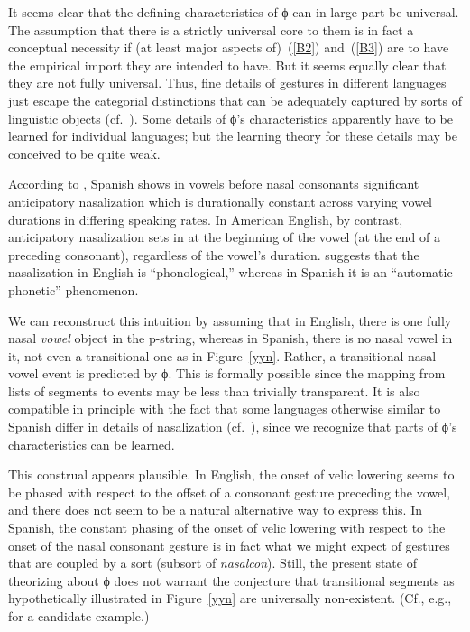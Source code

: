 \documentclass[output=paper]{langsci/langscibook}
\begin{document}
It seems clear that the defining characteristics of ϕ can in
large part be universal. The assumption that there is a strictly
universal core to them is in fact a conceptual necessity if (at least major
aspects of)~(\ref{B2}) and~(\ref{B3}) are to have the empirical import they
are intended to have.  But it seems equally clear that they are not fully
universal. Thus, fine details of gestures in different languages just
escape the categorial distinctions that can be adequately captured by sorts
of linguistic objects (cf.\ \citealt{lade:80}). Some
details of ϕ's characteristics apparently have to be learned for
individual languages; but the learning theory for these details may be
conceived to be quite weak.  %

According to \cite{sole:95}, Spanish shows
in vowels before nasal consonants significant anticipatory nasalization
which is durationally constant across varying vowel durations in differing
speaking rates. In American English, by contrast, anticipatory nasalization
sets in at the beginning of the vowel (at the end of a preceding
consonant), regardless of the vowel's duration.
\cite{sole:95} suggests that the
nasalization in English is ``phonological,'' whereas in Spanish it is an
``automatic phonetic'' phenomenon.

We can reconstruct this intuition by assuming that in English, there is one
fully nasal \textit{vowel}\/ object in the p-string, whereas in Spanish, there
is no nasal vowel in it, not even a transitional one as
in Figure~\ref{yyn}.  Rather, a transitional nasal vowel event is predicted
by ϕ. This is formally possible since the mapping from lists of
segments to events may be less than trivially transparent. It is also
compatible in principle with the fact that some languages otherwise similar
to Spanish differ in details of nasalization
(cf.\ \citealt{clum:76}), since we recognize that parts of
ϕ's characteristics can be learned.

This construal appears plausible. In English, the onset of velic lowering
seems to be phased 
with respect to
the offset of a consonant gesture preceding the
vowel, and there does not seem to be a natural alternative way to express
this. In Spanish, the constant phasing of the onset of velic lowering 
with respect to
the onset of the nasal consonant gesture is in fact what we might expect of
gestures that are coupled by a sort (subsort of \textit{nasalcon}\/). Still,
the present state of theorizing about ϕ does not warrant the
conjecture that transitional segments as hypothetically illustrated
in Figure~\ref{yyn} are universally non-existent. (Cf., e.g.,
\citealt[164]{moha:86} for a candidate example.)
\end{document}

